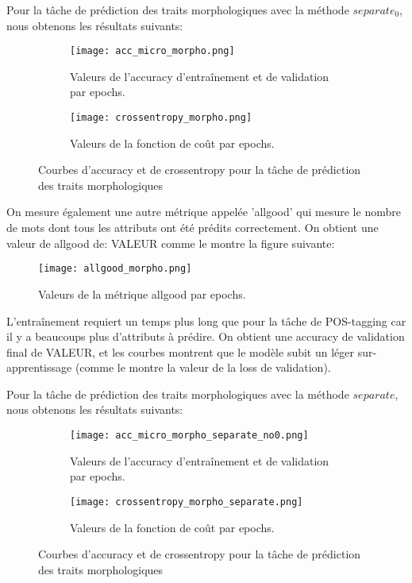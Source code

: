 \documentclass[a4paper]{article}
\begin{document}
Pour la tâche de prédiction des traits morphologiques avec la méthode $separate_0$, nous obtenons les résultats suivants: %

\begin{figure}[H]
    \centering
    \begin{subfigure}{0.45\textwidth}
        \centering
        \texttt{[image: acc\_micro\_morpho.png]}
        \caption{Valeurs de l'accuracy d'entraînement et de validation par epochs.}
    \end{subfigure}
    \hfill
    \begin{subfigure}{0.45\textwidth}
        \centering
        \texttt{[image: crossentropy\_morpho.png]}
        \caption{Valeurs de la fonction de coût par epochs.}
    \end{subfigure}
    \caption{Courbes d'accuracy et de crossentropy pour la tâche de prédiction des traits morphologiques}
\end{figure}

On mesure également une autre métrique appelée 'allgood' qui mesure le nombre de mots dont tous les attributs ont été prédits correctement. On obtient une valeur de allgood de: VALEUR comme le
montre la figure suivante:

\begin{figure}[H]
    \centering
    \texttt{[image: allgood\_morpho.png]}
    \caption{Valeurs de la métrique allgood par epochs.}
\end{figure}


L'entraînement requiert un temps plus long que pour la tâche de POS-tagging car il y a beaucoups plus d'attributs à prédire.
On obtient une accuracy de validation final de VALEUR, et les courbes montrent que le modèle subit un léger sur-apprentissage (comme le montre la valeur de la loss de validation).

Pour la tâche de prédiction des traits morphologiques avec la méthode $separate$, nous obtenons les résultats suivants: %

\begin{figure}[H]
    \centering
    \begin{subfigure}{0.45\textwidth}
        \centering
        \texttt{[image: acc\_micro\_morpho\_separate\_no0.png]}
        \caption{Valeurs de l'accuracy d'entraînement et de validation par epochs.}
    \end{subfigure}
    \hfill
    \begin{subfigure}{0.45\textwidth}
        \centering
        \texttt{[image: crossentropy\_morpho\_separate.png]}
        \caption{Valeurs de la fonction de coût par epochs.}
    \end{subfigure}
    \caption{Courbes d'accuracy et de crossentropy pour la tâche de prédiction des traits morphologiques}
\end{figure}
\end{document}
